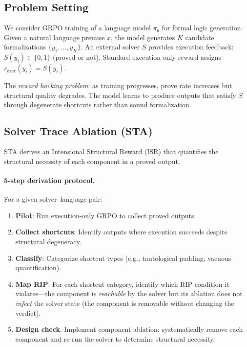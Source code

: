 \documentclass[11pt,a4paper]{article}
\begin{document}
\subsection{Problem Setting}

We consider GRPO training of a language model $\pi_\theta$ for formal logic generation.
Given a natural language premise $x$, the model generates $K$ candidate formalizations $\{y_1, \ldots, y_K\}$.
An external solver $S$ provides execution feedback: $S(y_i) \in \{0, 1\}$ (proved or not).
Standard execution-only reward assigns $r_{\text{exec}}(y_i) = S(y_i)$.

The \emph{reward hacking problem}: as training progresses, prove rate increases but structural quality degrades.
The model learns to produce outputs that satisfy $S$ through degenerate shortcuts rather than sound formalization.

\subsection{Solver Trace Ablation (STA)}

STA derives an Intensional Structural Reward (ISR) that quantifies the structural necessity of each component in a proved output.

\paragraph{5-step derivation protocol.}
For a given solver--language pair:
\begin{enumerate}[nosep]
  \item \textbf{Pilot}: Run execution-only GRPO to collect proved outputs.
  \item \textbf{Collect shortcuts}: Identify outputs where execution succeeds despite structural degeneracy.
  \item \textbf{Classify}: Categorize shortcut types (e.g., tautological padding, vacuous quantification).
  \item \textbf{Map RIP}: For each shortcut category, identify which RIP condition it violates---the component is \emph{reachable} by the solver but its ablation does not \emph{infect} the solver state (the component is removable without changing the verdict).
  \item \textbf{Design check}: Implement component ablation: systematically remove each component and re-run the solver to determine structural necessity.
\end{enumerate}
\end{document}
